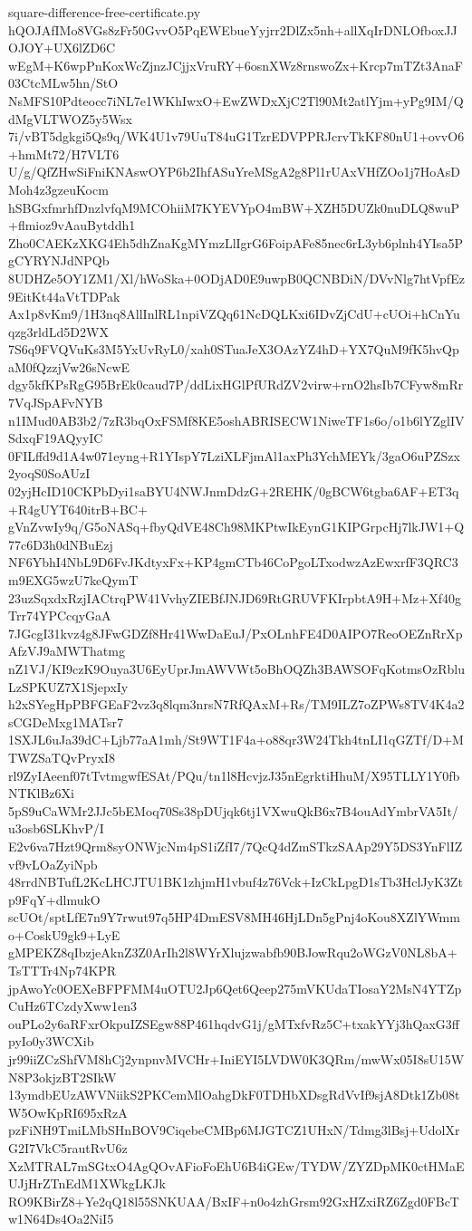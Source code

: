 \documentclass[11pt]{article}
\theoremstyle{definition}
\theoremstyle{remark}
\begin{document}
\begin{filecontents*}[overwrite]{square-difference-free-certificate.py}
hQOJAfIMo8VGs8zFr50GvvO5PqEWEbueYyjrr2DlZx5nh+allXqIrDNLOfboxJJOJOY+UX6lZD6C
wEgM+K6wpPnKoxWcZjnzJCjjxVruRY+6osnXWz8rnswoZx+Krcp7mTZt3AnaF03CtcMLw5hn/StO
NsMFS10Pdteocc7iNL7e1WKhIwxO+EwZWDxXjC2Tl90Mt2atlYjm+yPg9IM/QdMgVLTWOZ5y5Wsx
7i/vBT5dgkgi5Qs9q/WK4U1v79UuT84uG1TzrEDVPPRJcrvTkKF80nU1+ovvO6+hmMt72/H7VLT6
U/g/QfZHwSiFniKNAswOYP6b2IhfASuYreMSgA2g8Pl1rUAxVHfZOo1j7HoAsDMoh4z3gzeuKocm
hSBGxfmrhfDnzlvfqM9MCOhiiM7KYEVYpO4mBW+XZH5DUZk0nuDLQ8wuP+flmioz9vAauBytddh1
Zho0CAEKzXKG4Eh5dhZnaKgMYmzLlIgrG6FoipAFe85nec6rL3yb6plnh4YIsa5PgCYRYNJdNPQb
8UDHZe5OY1ZM1/Xl/hWoSka+0ODjAD0E9uwpB0QCNBDiN/DVvNlg7htVpfEz9EitKt44aVtTDPak
Ax1p8vKm9/1H3nq8AllInlRL1npiVZQq61NcDQLKxi6IDvZjCdU+cUOi+hCnYuqzg3rldLd5D2WX
7S6q9FVQVuKs3M5YxUvRyL0/xah0STuaJeX3OAzYZ4hD+YX7QuM9fK5hvQpaM0fQzzjVw26sNcwE
dgy5kfKPsRgG95BrEk0caud7P/ddLixHGlPfURdZV2virw+rnO2hsIb7CFyw8mRr7VqJSpAFvNYB
n1IMud0AB3b2/7zR3bqOxFSMf8KE5oshABRISECW1NiweTF1s6o/o1b6lYZglIVSdxqF19AQyyIC
0FILffd9d1A4w071eyng+R1YIspY7LziXLFjmAl1axPh3YchMEYk/3gaO6uPZSzx2yoqS0SoAUzI
02yjHcID10CKPbDyi1saBYU4NWJnmDdzG+2REHK/0gBCW6tgba6AF+ET3q+R4gUYT640itrB+BC+
gVnZvwIy9q/G5oNASq+fbyQdVE48Ch98MKPtwIkEynG1KIPGrpcHj7lkJW1+Q77c6D3h0dNBuEzj
NF6YbhI4NbL9D6FvJKdtyxFx+KP4gmCTb46CoPgoLTxodwzAzEwxrfF3QRC3m9EXG5wzU7keQymT
23uzSqxdxRzjIACtrqPW41VvhyZIEBfJNJD69RtGRUVFKIrpbtA9H+Mz+Xf40gTrr74YPCcqyGaA
7JGcgI31kvz4g8JFwGDZf8Hr41WwDaEuJ/PxOLnhFE4D0AIPO7ReoOEZnRrXpAfzVJ9aMWThatmg
nZ1VJ/KI9czK9Ouya3U6EyUprJmAWVWt5oBhOQZh3BAWSOFqKotmsOzRbluLzSPKUZ7X1SjepxIy
h2xSYegHpPBFGEaF2vz3q8lqm3nrsN7RfQAxM+Rs/TM9ILZ7oZPWs8TV4K4a2sCGDeMxg1MATsr7
1SXJL6uJa39dC+Ljb77aA1mh/St9WT1F4a+o88qr3W24Tkh4tnLI1qGZTf/D+MTWZSaTQvPryxI8
rl9ZyIAeenf07tTvtmgwfESAt/PQu/tn1l8HcvjzJ35nEgrktiHhuM/X95TLLY1Y0fbNTKlBz6Xi
5pS9uCaWMr2JJc5bEMoq70Ss38pDUjqk6tj1VXwuQkB6x7B4ouAdYmbrVA5It/u3osb6SLKhvP/I
E2v6va7Hzt9Qrm8syONWjcNm4pS1iZfI7/7QcQ4dZmSTkzSAAp29Y5DS3YnFlIZvf9vLOaZyiNpb
48rrdNBTufL2KcLHCJTU1BK1zhjmH1vbuf4z76Vck+IzCkLpgD1sTb3HclJyK3Ztp9FqY+dlmukO
scUOt/sptLfE7n9Y7rwut97q5HP4DmESV8MH46HjLDn5gPnj4oKou8XZlYWmmo+CoskU9gk9+LyE
gMPEKZ8qIbzjeAknZ3Z0ArIh2l8WYrXlujzwabfb90BJowRqu2oWGzV0NL8bA+TsTTTr4Np74KPR
jpAwoYc0OEXeBFPFMM4uOTU2Jp6Qet6Qeep275mVKUdaTIosaY2MsN4YTZpCuHz6TCzdyXww1en3
ouPLo2y6aRFxrOkpuIZSEgw88P461hqdvG1j/gMTxfvRz5C+txakYYj3hQaxG3ffpyIo0y3WCXib
jr99iiZCzShfVM8hCj2ynpnvMVCHr+IniEYI5LVDW0K3QRm/mwWx05I8sU15WN8P3okjzBT2SIkW
13ymdbEUzAWVNiikS2PKCemMlOahgDkF0TDHbXDsgRdVvIf9sjA8Dtk1Zb08tW5OwKpRI695xRzA
pzFiNH9TmiLMbSHnBOV9CiqebeCMBp6MJGTCZ1UHxN/Tdmg3lBsj+UdolXrG2I7VkC5rautRvU6z
XzMTRAL7mSGtxO4AgQOvAFioFoEhU6B4iGEw/TYDW/ZYZDpMK0ctHMaEUJjHrZTnEdM1XWkgLKJk
RO9KBirZ8+Ye2qQ18l55SNKUAA/BxIF+n0o4zhGrsm92GxHZxiRZ6Zgd0FBcTw1N64Ds4Oa2NiI5

\end{filecontents*}
\end{document}
